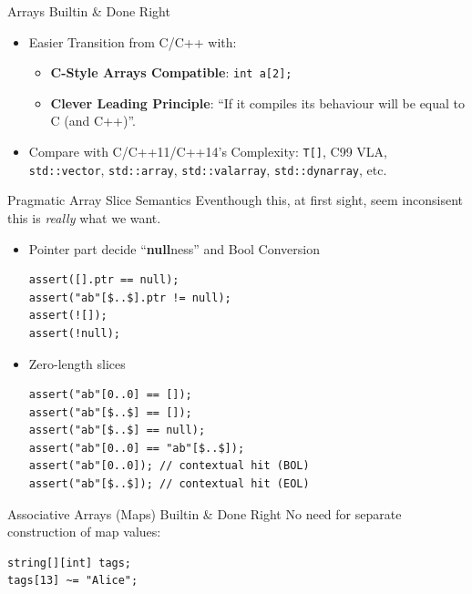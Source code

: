 \documentclass[xcolor=dvipsnames]{beamer}
\begin{document}
\begin{frame}[fragile]{Arrays Builtin \& Done Right}
  \begin{itemize}[<+->]
  \item Easier Transition from C/C++ with:
    \begin{itemize}[<+->]
    \item \textbf{C-Style Arrays Compatible}: \texttt{int a[2];}
    \item \textbf{Clever Leading Principle}: ``If it compiles its behaviour will be
      equal to C (and C++)''.
    \end{itemize}
  \item Compare with C/C++11/C++14’s Complexity: \texttt{T[]}, C99 VLA,
    \texttt{std::vector}, \texttt{std::array}, \texttt{std::valarray},
    \texttt{std::dynarray}, etc.
  \end{itemize}
\end{frame}

\begin{frame}[fragile]{Pragmatic Array Slice Semantics}
  Eventhough this, at first sight, seem inconsisent this is \emph{really} what
  we want.
  \begin{itemize}[<+->]

  \item Pointer part decide ``\textbf{null}ness'' and Bool Conversion
    \begin{lstlisting}[frame=single]
assert([].ptr == null);
assert("ab"[$..$].ptr != null);
assert(![]);
assert(!null);
    \end{lstlisting}

  \item Zero-length slices
    \begin{lstlisting}[frame=single]
assert("ab"[0..0] == []);
assert("ab"[$..$] == []);
assert("ab"[$..$] == null);
assert("ab"[0..0] == "ab"[$..$]);
assert("ab"[0..0]); // contextual hit (BOL)
assert("ab"[$..$]); // contextual hit (EOL)
    \end{lstlisting}

  \end{itemize}
\end{frame}

\begin{frame}[fragile]{Associative Arrays (Maps) Builtin \& Done Right}
  No need for separate construction of map values:
  \begin{lstlisting}[frame=single]
string[][int] tags;
tags[13] ~= "Alice";
  \end{lstlisting}
\end{frame}
\end{document}
